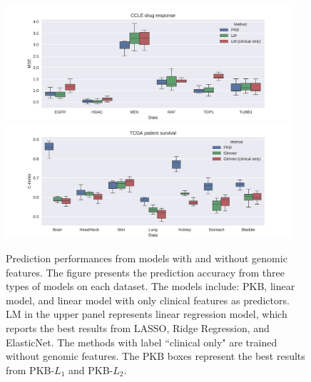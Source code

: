 \documentclass[a4paper,12pt]{article}
\begin{document}
\newpage
\begin{figure}[htp]
	\centering
	\includegraphics[width = 0.95\textwidth]{PKB_LM_LMc.pdf} \\ \vspace{-4mm}
	\includegraphics[width = 0.95\textwidth]{PKB_LM_LMc_surv.pdf}
	\caption{Prediction performances from models with and without genomic features. The figure presents the prediction accuracy from three types of models on each dataset. The models include: PKB, linear model, and linear model with only clinical features as predictors. LM in the upper panel represents linear regression model, which reports the best results from LASSO, Ridge Regression, and ElasticNet. The methods with label ``clinical only" are trained without genomic features. The PKB boxes represent the best results from PKB-$L_1$ and PKB-$L_2$.}
	\label{fig:clin_noclin}
\end{figure}
	\newpage
\end{document}
